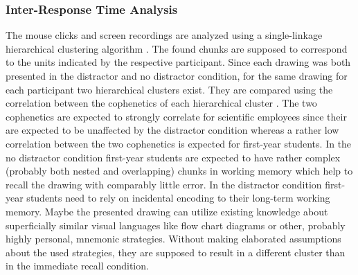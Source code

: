 \subsubsection{Inter-Response Time Analysis}
The mouse clicks and screen recordings are analyzed using a single-linkage hierarchical clustering algorithm \parencites(cf.)(){moss2006role}.
The found chunks are supposed to correspond to the units indicated by the respective participant.
Since each drawing was both presented in the distractor and no distractor condition, for the same drawing for each participant two hierarchical clusters exist.
They are compared using the correlation between the cophenetics of each hierarchical cluster \parencites(cf.)(){fowlkes1983method}.
The two cophenetics are expected to strongly correlate for scientific employees since their are expected to be unaffected by the distractor condition whereas a rather low correlation between the two cophenetics is expected for first-year students. 
In the no distractor condition first-year students are expected to have rather complex (probably both nested and overlapping) chunks in working memory which help to recall the drawing with comparably little error.
In the distractor condition first-year students need to rely on incidental encoding to their long-term working memory.
Maybe the presented drawing can utilize existing knowledge about superficially similar visual languages like flow chart diagrams or other, probably highly personal, mnemonic strategies.
Without making elaborated assumptions about the used strategies, they are supposed to result in a different cluster than in the immediate recall condition.
